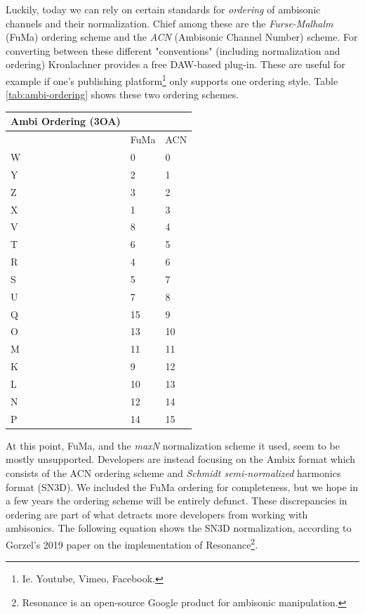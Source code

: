 
Luckily, today we can rely on certain standards for \textit{ordering} of ambisonic channels and their normalization. Chief among these are the \textit{Furse-Malhalm} (FuMa) ordering scheme and the \textit{ACN} (Ambisonic Channel Number) scheme. For converting between these different "conventions" (including normalization and ordering) Kronlachner \cite{kronlachner2014plug} provides a free DAW-based plug-in. These are useful for example if one's publishing platform\footnote{Ie. Youtube, Vimeo, Facebook.} only supports one ordering style. Table \ref{tab:ambi-ordering} shows these two ordering schemes. 


\begin{center}
    \begin{tabular}{ | l | l | l | }
    \hline
	Ambi Ordering (3OA) &  &  \\ \hline
	 & FuMa & ACN \\ \hline
	W & 0 & 0 \\ \hline
	Y & 2 & 1 \\ \hline
	Z & 3 & 2 \\ \hline
	X & 1 & 3 \\ \hline
	V & 8 & 4 \\ \hline
	T & 6 & 5 \\ \hline
	R & 4 & 6 \\ \hline
	S & 5 & 7 \\ \hline
	U & 7 & 8 \\ \hline
	Q & 15 & 9 \\ \hline
	O & 13 & 10 \\ \hline
	M & 11 & 11 \\ \hline
	K & 9 & 12 \\ \hline
	L & 10 & 13 \\ \hline
	N & 12 & 14 \\ \hline
	P & 14 & 15 \\ \hline
    \end{tabular}
    \label{tab:ambi-ordering}
\end{center}

At this point, FuMa, and the \textit{maxN} normalization scheme it used, seem to be mostly unsupported. Developers are instead focusing on the Ambix format which consists of the ACN ordering scheme and \textit{Schmidt semi-normalized} harmonics format (SN3D). We included the FuMa ordering for completeness, but we hope in a few years the ordering scheme will be entirely defunct. These discrepancies in ordering are part of what detracts more developers from working with ambisonics. The following equation shows the SN3D normalization, according to Gorzel's 2019 \cite{gorzel2019efficient} paper on the implementation of Resonance\footnote{Resonance is an open-source Google product for ambisonic manipulation.}. 

